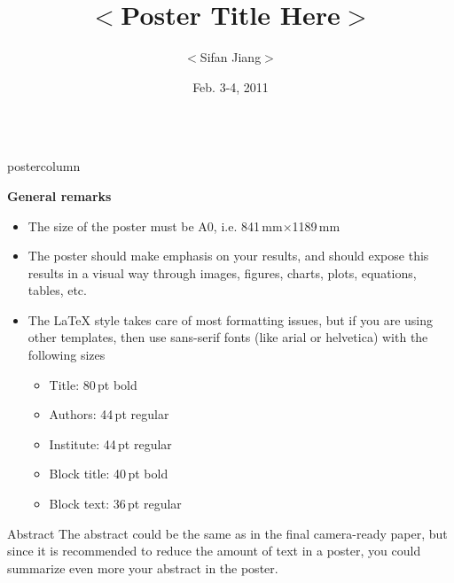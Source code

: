 \documentclass[final,hyperref={pdfpagelabels=false}]{beamer}
\title{\huge $<$Poster Title Here$>$}
\author{$<$Sifan Jiang$>$}
\institute[$<$Short institute$>$]{$<$UM-SJTU Joint Institute, Shanghai Jiao Tong University, Shanghai$>$}
\date[Feb. 3-4, 2011]{Feb. 3-4, 2011}
\newlength{\columnheight}
\begin{document}
\begin{frame}
  \begin{columns}
    \begin{column}{.49\textwidth}
      \begin{beamercolorbox}[center,wd=\textwidth]{postercolumn}
        \begin{minipage}[T]{.95\textwidth}  
          \parbox[t][\columnheight]{\textwidth}{
            {\large{\textbf{General remarks}}}
            \begin{itemize}
            \item The size of the poster must be A0, i.e. 841\,mm$\times$1189\,mm
            \item The poster should make emphasis on your results, and should expose this
              results in a visual way through images, figures, charts, plots, equations, tables,
              etc.
            \item The LaTeX style takes care of most formatting issues, but if you are using 
              other templates, then use sans-serif fonts (like arial or helvetica) with the
              following sizes
              \begin{itemize}
              \item Title: 80\,pt bold
              \item Authors: 44\,pt regular
              \item Institute: 44\,pt regular
              \item Block title: 40\,pt bold
              \item Block text: 36\,pt regular
              \end{itemize}
            \end{itemize}

            \vfill

            \begin{block}{Abstract}
              The abstract could be the same as in the final camera-ready paper, but since
              it is recommended to reduce the amount of text in a poster, you could summarize even
              more your abstract in the poster.
            \end{block}

}
\end{minipage}
\end{beamercolorbox}
\end{column}
\end{columns}
\end{frame}
\end{document}
